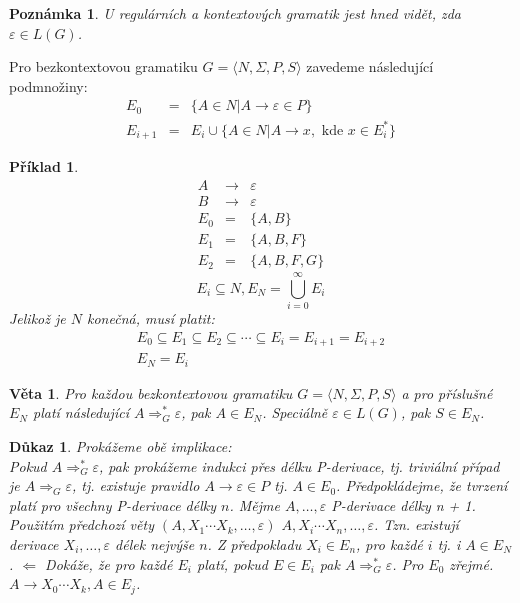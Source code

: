 \documentclass[10pt, a4paper, titlepage]{article}
\theoremstyle{note}
\newtheorem{veta}{\textbf{Věta}}
\newtheorem{dukaz}{\textbf{Důkaz}}
\newtheorem{priklad}{\textbf{Příklad}}
\newtheorem{poznamka}{\textbf{Poznámka}}
\begin{document}
\begin{poznamka}
U regulárních a kontextových gramatik jest hned vidět, zda $\varepsilon \in L(G)$.
\end{poznamka}

Pro bezkontextovou gramatiku $G = \langle N, \Sigma, P,S \rangle$ zavedeme následující podmnožiny:
\begin{eqnarray*}
E_{0} &=& \lbrace A \in N | A \rightarrow \varepsilon \in P \rbrace \\
E_{i+1} &=& E_{i} \cup \lbrace A \in N | A \rightarrow x, \text{ kde } x \in E_{i}^* \rbrace
\end{eqnarray*}

\begin{priklad}
\begin{eqnarray*}
A &\rightarrow& \varepsilon \\
B &\rightarrow& \varepsilon \\
E_{0} &=& \lbrace A, B \rbrace \\
E_{1} &=& \lbrace A, B, F \rbrace \\
E_{2} &=& \lbrace A, B, F, G \rbrace
\end{eqnarray*}
$$
E_{i} \subseteq N, E_{N} = \bigcup_{i=0}^{\infty} E_{i}
$$
Jelikož je $N$ konečná, musí platit:
\begin{gather*}
E_{0} \subseteq E_{1} \subseteq E_{2} \subseteq \cdots \subseteq E_{i} = E_{i+1} = E_{i+2} \\
E_{N} = E_{i}
\end{gather*}
\end{priklad}


\begin{veta}
Pro každou bezkontextovou gramatiku $G = \langle N, \Sigma, P,S \rangle$ a pro příslušné $E_{N}$ platí následující $A \Rightarrow_{G}^{*}\varepsilon$, pak $A \in E_{N}$. 
Speciálně $\varepsilon \in L(G)$, pak $S \in E_{N}$.
\end{veta}

\begin{dukaz}
Prokážeme obě implikace: \\
Pokud $A \Rightarrow_{G}^{*}\varepsilon$, pak prokážeme indukci přes délku P-derivace, tj. triviální případ je $A \Rightarrow_{G}\varepsilon$, 
tj. existuje pravidlo $A \rightarrow \varepsilon \in P$ tj. $A \in E_{0}$.
Předpokládejme, že tvrzení platí pro všechny P-derivace délky $n$.
Mějme $A, \ldots, \varepsilon$ P-derivace délky n + 1. Použitím předchozí věty $(A, X_{1} \cdots X_{k}, \ldots, \varepsilon)$ $A, X_{i} \cdots X_{n}, \ldots, \varepsilon$.
Tzn. existují derivace $X_{i}, \ldots, \varepsilon$ délek nejvýše $n$. Z předpokladu $X_{i} \in E_{n}$, pro každé $i$ tj. i $A \in E_{N}$. 
$\Leftarrow$ Dokáže, že pro každé $E_{i}$ platí, pokud $E \in E_{i}$ pak $A \Rightarrow_{G}^{*}\varepsilon$. Pro $E_{0}$ zřejmé.
$A \rightarrow X_{0} \cdots X_{k}, A \in E_{j}$.
\end{dukaz}
\end{document}
